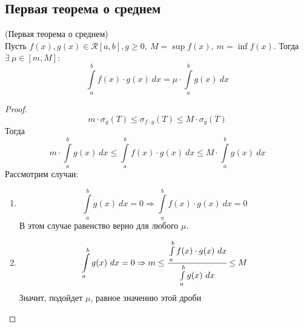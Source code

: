 \subsection{Первая теорема о среднем}

\begin{theorem} (Первая теорема о среднем)\\
    Пусть $f(x), g(x) \in \mathcal{R}[a, b], g \geq 0,\ M = \sup f(x),\ m = \inf f(x)$. Тогда\\
    $\exists\ \mu\in [m,M]$:
    \[\int\limits_{a}^{b}f(x)\cdot g(x)\ dx = \mu\cdot\int\limits_{a}^{b}g(x)\ dx\]
\end{theorem}
\begin{proof}
    \[m\cdot \sigma_g(T) \leq \sigma_{f\cdot g}(T) \leq M\cdot\sigma_g(T)\]
    Тогда
    \[m\cdot \int\limits_{a}^{b} g(x)\ dx \leq \int\limits_{a}^{b} f(x)\cdot g(x)\ dx \leq M\cdot\int\limits_{a}^{b} g(x)\ dx\]
    Рассмотрим случаи:
    \begin{enumerate}
        \item 
        \[\int\limits_{a}^{b} g(x)\ dx = 0 \Rightarrow \int\limits_{a}^{b} f(x)\cdot g(x)\ dx = 0\]
        В этом случае равенство верно для любого $\mu$.
        \item
        \[\int\limits_{a}^{b} g(x)\ dx = 0 \Rightarrow m\leq \cfrac{\int\limits_{a}^{b} f(x)\cdot g(x)\ dx}{\int\limits_{a}^{b} g(x)\ dx}\leq M\]
        Значит, подойдет $\mu$, равное значению этой дроби
    \end{enumerate}
\end{proof}
